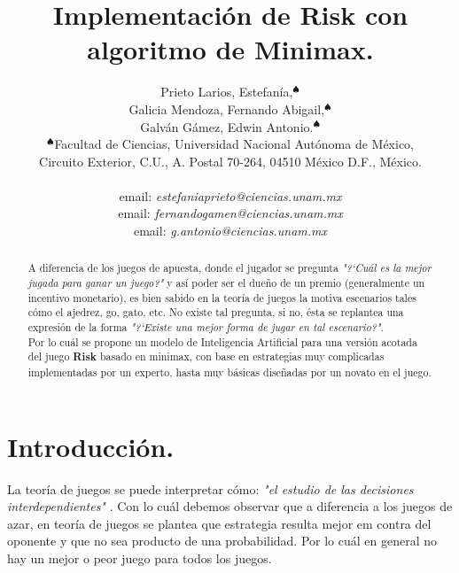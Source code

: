 \documentclass[12pt]{article}
\begin{document}
\title{\textbf{Implementaci\'on de Risk con algoritmo de Minimax.}}
\author{Prieto Larios, Estefan\'ia,$^{\spadesuit}$\\
Galicia Mendoza, Fernando Abigail,$^{\spadesuit}$\\
Galv\'an G\'amez, Edwin Antonio.$^{\spadesuit}$\\
$^{\spadesuit}$Facultad de Ciencias, Universidad Nacional Aut\'onoma de M\'exico,\\ Circuito Exterior, C.U., A. Postal 70-264, 04510 M\'exico D.F., M\'exico. \\
\\
email: \textit{estefaniaprieto@ciencias.unam.mx}\\
email: \textit{fernandogamen@ciencias.unam.mx}\\
email: \textit{g.antonio@ciencias.unam.mx}\\
}

\maketitle
\thispagestyle{empty}
\begin{abstract}
A diferencia de los juegos de apuesta, donde el jugador se pregunta \textit{"?`Cu\'al es la mejor jugada para ganar un juego?"} y as\'i poder ser el due\~{n}o de un premio (generalmente un incentivo monetario), es bien sabido en la teor\'ia de juegos la motiva escenarios tales c\'omo el ajedrez, go, gato, etc. No existe tal pregunta, si no, \'esta se replantea una expresi\'on de la forma \textit{"?`Existe una mejor forma de jugar en tal escenario?"}.\\
Por lo cu\'al se propone un modelo de Inteligencia Artificial para una versi\'on acotada del juego \textbf{Risk} basado en minimax, con base en estrategias muy complicadas implementadas por un experto, hasta muy b\'asicas diseñadas por un novato en el juego.\\
\end{abstract}


\section{Introducci\'on.}

La teor\'ia de juegos se puede interpretar c\'omo: \textit{"el estudio de las decisiones interdependientes"} \cite{teoriaDeJuegos}. Con lo cu\'al debemos observar que a diferencia a los juegos de azar, en teor\'ia de juegos se plantea que estrategia resulta mejor em contra del oponente y que no sea producto de una probabilidad. Por lo cu\'al en general no hay un mejor o peor juego para todos los juegos.\\
\end{document}
